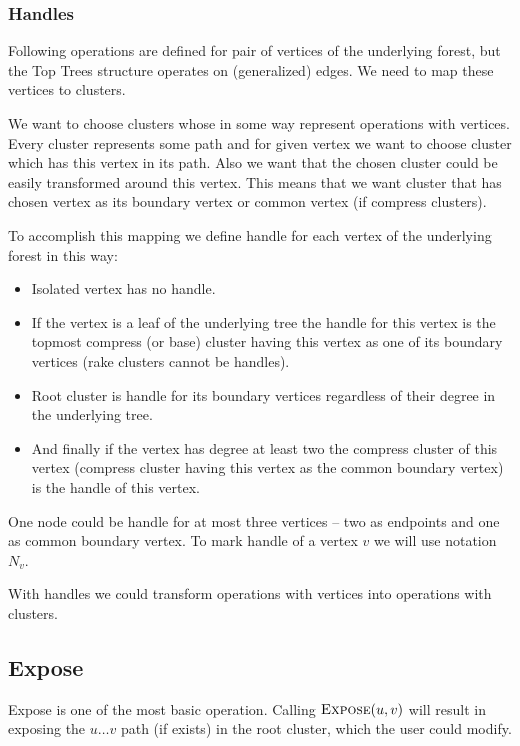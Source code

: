 \subsubsection{Handles}

Following operations are defined for pair of vertices of the underlying forest,
but the Top Trees structure operates on (generalized) edges. We need to map
these vertices to clusters.

We want to choose clusters whose in some way represent operations with
vertices. Every cluster represents some path and for given vertex we want to
choose cluster which has this vertex in its path. Also we want that the chosen
cluster could be easily transformed around this vertex. This means that we want
cluster that has chosen vertex as its boundary vertex or common vertex
(if compress clusters).

To accomplish this mapping we define {\I handle} for each vertex of the
underlying forest in this way:

\begin{itemize}
\item Isolated vertex has no handle.
\item If the vertex is a leaf of the underlying tree the
handle for this vertex is the topmost compress (or base) cluster having this
vertex as one of its boundary vertices (rake clusters cannot be handles).
\item Root cluster is handle for its boundary vertices regardless of their
degree in the underlying tree.
\item And finally if the vertex has degree at least two the compress cluster of
this vertex (compress cluster having this vertex as the common boundary vertex)
is the handle of this vertex.
\end{itemize}

One node could be handle for at most three vertices -- two as endpoints and one
as common boundary vertex. To mark handle of a vertex $v$ we will use notation
$N_v$.

With handles we could transform operations with vertices into operations with
clusters.

\subsection{\sc Expose}

Expose is one of the most basic operation. Calling $\hbox{\sc Expose}(u,v)$ will result in
exposing the $u\dots v$ path (if exists) in the root cluster, which the user
could modify.

